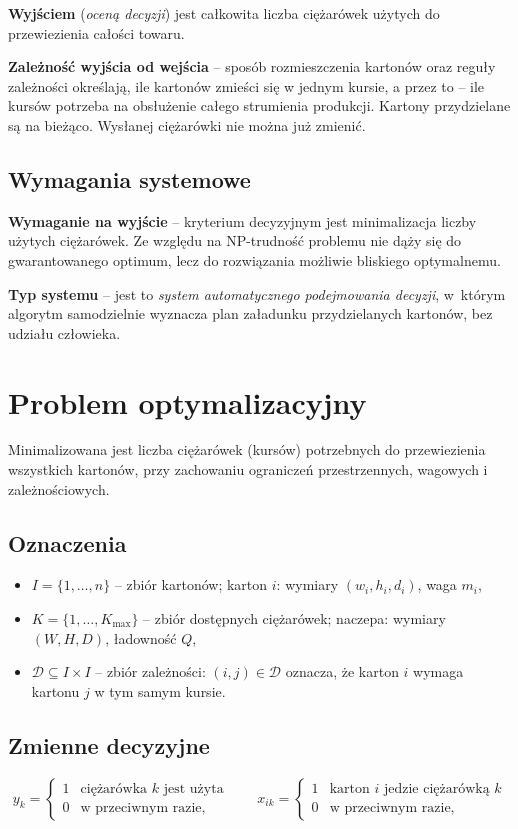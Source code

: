 \documentclass[12pt]{article}
\begin{document}
\textbf{Wyjściem} (\textit{oceną decyzji}) jest całkowita liczba ciężarówek użytych do przewiezienia całości towaru.

\textbf{Zależność wyjścia od wejścia} -- sposób rozmieszczenia kartonów oraz reguły zależności określają, ile kartonów zmieści się w jednym kursie, a przez to -- ile kursów potrzeba na obsłużenie całego strumienia produkcji. Kartony przydzielane są na bieżąco. Wysłanej ciężarówki nie można już zmienić.

\subsection{Wymagania systemowe}

\textbf{Wymaganie na wyjście} -- kryterium decyzyjnym jest minimalizacja liczby użytych ciężarówek. Ze względu na NP-trudność problemu nie dąży się do gwarantowanego optimum, lecz do rozwiązania możliwie bliskiego optymalnemu.

\textbf{Typ systemu} -- jest to \textit{system automatycznego podejmowania decyzji}, w~którym algorytm samodzielnie wyznacza plan załadunku przydzielanych kartonów, bez udziału człowieka.

\section{Problem optymalizacyjny}

Minimalizowana jest liczba ciężarówek (kursów) potrzebnych do przewiezienia wszystkich kartonów, przy zachowaniu ograniczeń przestrzennych, wagowych i zależnościowych.

\subsection{Oznaczenia}

\begin{itemize}
    \item $I=\{1,\dots,n\}$ -- zbiór kartonów; karton $i$: wymiary $(w_i,h_i,d_i)$, waga $m_i$,
    \item $K=\{1,\dots,K_{\max}\}$ -- zbiór dostępnych ciężarówek; naczepa: wymiary $(W,H,D)$, ładowność $Q$,
    \item $\mathcal{D}\subseteq I\times I$ -- zbiór zależności: $(i,j)\in\mathcal{D}$ oznacza, że karton $i$ wymaga kartonu $j$ w tym samym kursie.
\end{itemize}

\subsection{Zmienne decyzyjne}
\[
y_k=\begin{cases}1 & \text{ciężarówka } k \text{ jest użyta}\\ 0 & \text{w przeciwnym razie,}\end{cases}
\qquad
x_{ik}=\begin{cases}1 & \text{karton } i \text{ jedzie ciężarówką } k\\ 0 & \text{w przeciwnym razie,}\end{cases}
\]
\end{document}
